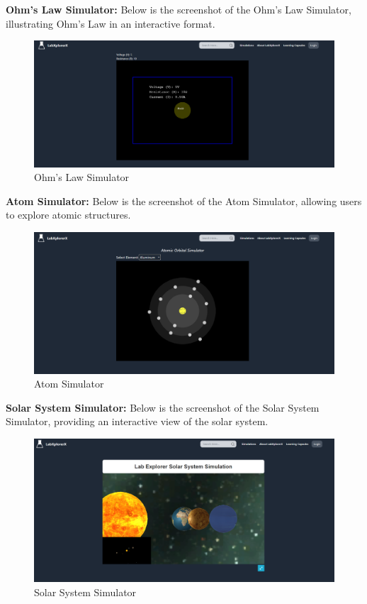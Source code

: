 \textbf{Ohm's Law Simulator:} Below is the screenshot of the Ohm's Law Simulator, illustrating Ohm's Law in an interactive format.
\begin{figure}[H]
    \centering
    \includegraphics[width = 16cm]{Diagrams/output/ohms.png}
    \caption{Ohm's Law Simulator}
\end{figure}
\newpage

\textbf{Atom Simulator:} Below is the screenshot of the Atom Simulator, allowing users to explore atomic structures.
\begin{figure}[H]
    \centering
    \includegraphics[width = 16cm]{Diagrams/output/atom.png}
    \caption{Atom Simulator}
\end{figure}

\textbf{Solar System Simulator:} Below is the screenshot of the Solar System Simulator, providing an interactive view of the solar system.
\begin{figure}[H]
    \centering
    \includegraphics[width = 16cm]{Diagrams/output/solar.png}
    \caption{Solar System Simulator}
\end{figure}
\newpage


